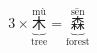 {\Large \[ 3\times \underbrace{\overset{\text{mù}}{\text{木}}}_{\text{tree}} = \underbrace{\overset{\text{sēn}}{\text{森}}}_{\text{forest}} \]}
